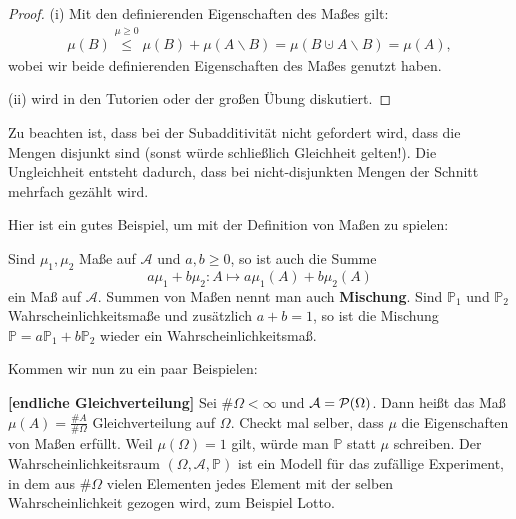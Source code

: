 \begin{proof}
(i) Mit den definierenden Eigenschaften des Ma\ss es gilt:	
\begin{align*}
	\mu(B) \overset{\mu\geq 0}{\leq} \mu(B) + \mu(A\backslash B) =\mu(B\cupdot A\backslash B)= \mu(A),
\end{align*}
wobei wir beide definierenden Eigenschaften des Ma\ss es genutzt haben.\smallskip

(ii) wird in den Tutorien oder der gro\ss en \"Ubung diskutiert. 
\end{proof}
Zu beachten ist, dass bei der Subadditivit\"at nicht gefordert wird, dass die Mengen disjunkt sind (sonst w\"urde schlie\ss lich Gleichheit gelten!). Die Ungleichheit entsteht dadurch, dass bei nicht-disjunkten Mengen der Schnitt mehrfach gez\"ahlt wird.\smallskip

Hier ist ein gutes Beispiel, um mit der Definition von Ma\ss en zu spielen:
\begin{luebung}
		Sind $\mu_1,\mu_2$ Ma\ss e auf $\mathcal A$ und $a,b\geq 0$, so ist auch die Summe $$a\mu_1+b\mu_2: A\mapsto a\mu_1(A)+b\mu_2(A)$$ ein Ma\ss{} auf $\mathcal A$. Summen von Ma\ss en nennt man auch \textbf{Mischung}. Sind $\mathbb P_1$ und $\mathbb P_2$ Wahrscheinlichkeitsma\ss e und zus\"atzlich $a+b=1$, so ist die Mischung $\mathbb P= a \mathbb P_1+b\mathbb P_2$ wieder ein Wahrscheinlichkeitsma\ss. 
\end{luebung}



Kommen wir nun zu ein paar Beispielen:
\begin{beispiel}  \textbf{[endliche Gleichverteilung]}
	Sei $\#\Omega < \infty$ und $\mathcal{A} = \mathcal{P}(\Omega)$. Dann hei\ss t das Ma\ss{} $\mu(A) = \frac{\#A}{\#\Omega}$ Gleichverteilung auf $\Omega$. Checkt mal selber, dass $\mu$ die Eigenschaften von Ma\ss en erf\"ullt. Weil $\mu (\Omega) = 1$ gilt, würde man $\mathbb P$ statt $\mu$ schreiben. Der Wahrscheinlichkeitsraum $(\Omega, \mathcal A, \mathbb P)$ ist ein Modell f\"ur das zuf\"allige Experiment, in dem aus $\#\Omega$ vielen Elementen jedes Element mit der selben Wahrscheinlichkeit gezogen wird, zum Beispiel Lotto.
\end{beispiel}

